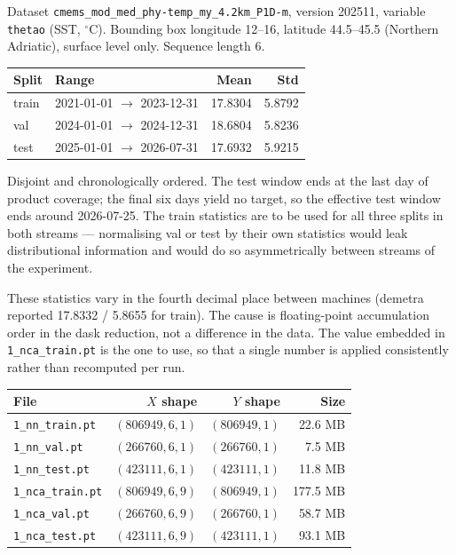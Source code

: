 \documentclass[11pt]{amsart}
\begin{document}
Dataset \texttt{cmems\_mod\_med\_phy-temp\_my\_4.2km\_P1D-m}, version 202511,
variable \texttt{thetao} (SST, ${}^\circ$C). Bounding box longitude 12--16,
latitude 44.5--45.5 (Northern Adriatic), surface level only. Sequence length 6.

\begin{table}[h]
\begin{tabular}{llrr}
\toprule
Split & Range & Mean & Std \\
\midrule
train & 2021-01-01 $\to$ 2023-12-31 & 17.8304 & 5.8792 \\
val   & 2024-01-01 $\to$ 2024-12-31 & 18.6804 & 5.8236 \\
test  & 2025-01-01 $\to$ 2026-07-31 & 17.6932 & 5.9215 \\
\bottomrule
\end{tabular}
\end{table}

Disjoint and chronologically ordered. The test window ends at the last day of
product coverage; the final six days yield no target, so the effective test
window ends around 2026-07-25. The train statistics are to be used for all
three splits in both streams --- normalising val or test by their own statistics
would leak distributional information and would do so asymmetrically between
streams of the experiment.

These statistics vary in the fourth decimal place between machines (demetra
reported 17.8332 / 5.8655 for train). The cause is floating-point accumulation
order in the dask reduction, not a difference in the data. The value embedded
in \texttt{1\_nca\_train.pt} is the one to use, so that a single number is
applied consistently rather than recomputed per run.

\begin{table}[h]
\begin{tabular}{lrrr}
\toprule
File & $X$ shape & $Y$ shape & Size \\
\midrule
\texttt{1\_nn\_train.pt}  & $(806949, 6, 1)$ & $(806949, 1)$ & 22.6 MB \\
\texttt{1\_nn\_val.pt}    & $(266760, 6, 1)$ & $(266760, 1)$ & 7.5 MB \\
\texttt{1\_nn\_test.pt}   & $(423111, 6, 1)$ & $(423111, 1)$ & 11.8 MB \\
\texttt{1\_nca\_train.pt} & $(806949, 6, 9)$ & $(806949, 1)$ & 177.5 MB \\
\texttt{1\_nca\_val.pt}   & $(266760, 6, 9)$ & $(266760, 1)$ & 58.7 MB \\
\texttt{1\_nca\_test.pt}  & $(423111, 6, 9)$ & $(423111, 1)$ & 93.1 MB \\
\bottomrule
\end{tabular}
\end{table}
\end{document}
